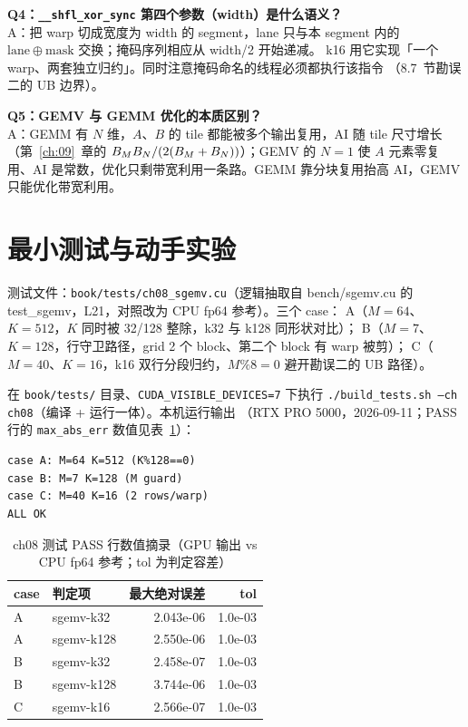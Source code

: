 \textbf{Q4：\texttt{\_\allowbreak{}\_\allowbreak{}shfl\_\allowbreak{}xor\_\allowbreak{}sync} 第四个参数（width）是什么语义？}\\
A：把 warp 切成宽度为 width 的 segment，lane 只与本 segment 内的
$\mathrm{lane} \oplus \mathrm{mask}$ 交换；掩码序列相应从 width/2 开始递减。
k16 用它实现「一个 warp、两套独立归约」。同时注意掩码命名的线程必须都执行该指令
（8.7~节勘误二的 UB 边界）。

\textbf{Q5：GEMV 与 GEMM 优化的本质区别？}\\
A：GEMM 有 $N$ 维，$A$、$B$ 的 tile 都能被多个输出复用，AI 随 tile 尺寸增长
（第~\ref{ch:09}~章的 $B\sb{M}B\sb{N}/(2(B\sb{M}+B\sb{N}))$）；GEMV 的 $N=1$ 使
$A$ 元素零复用、AI 是常数，优化只剩带宽利用一条路。GEMM 靠分块复用抬高 AI，GEMV 只能优化带宽利用。

\section{最小测试与动手实验}

测试文件：\texttt{book/\allowbreak{}tests/\allowbreak{}ch08\_\allowbreak{}sgemv.\allowbreak{}cu}（逻辑抽取自 bench/sgemv.cu 的
test\_sgemv，L21，对照改为 CPU fp64 参考）。三个 case：
A（$M{=}64$、$K{=}512$，$K$ 同时被 32/128 整除，k32 与 k128 同形状对比）；
B（$M{=}7$、$K{=}128$，行守卫路径，grid 2 个 block、第二个 block 有 warp 被剪）；
C（$M{=}40$、$K{=}16$，k16 双行分段归约，$M \% 8 = 0$ 避开勘误二的 UB 路径）。

在 \texttt{book/tests/} 目录、\texttt{CUDA\_\allowbreak{}VISIBLE\_\allowbreak{}DEVICES=\allowbreak{}7} 下执行
\texttt{.\allowbreak{}/\allowbreak{}build\_\allowbreak{}tests.\allowbreak{}sh --ch ch08}（编译 + 运行一体）。本机运行输出
（RTX PRO 5000，2026-09-11；PASS 行的 \texttt{max\_abs\_err} 数值见表~\ref{tab:8-pass}）：

\begin{lstlisting}[style=console]
case A: M=64 K=512 (K%128==0)
case B: M=7 K=128 (M guard)
case C: M=40 K=16 (2 rows/warp)
ALL OK
\end{lstlisting}

\begin{table}[htbp]
\centering
\caption{ch08 测试 PASS 行数值摘录（GPU 输出 vs CPU fp64 参考；tol 为判定容差）}
\label{tab:8-pass}
\begin{tabular}{llrr}
\toprule
case & 判定项 & 最大绝对误差 & tol \\
\midrule
A & sgemv-k32  & 2.043e-06 & 1.0e-03 \\
A & sgemv-k128 & 2.550e-06 & 1.0e-03 \\
B & sgemv-k32  & 2.458e-07 & 1.0e-03 \\
B & sgemv-k128 & 3.744e-06 & 1.0e-03 \\
C & sgemv-k16  & 2.566e-07 & 1.0e-03 \\
\bottomrule
\end{tabular}
\end{table}

